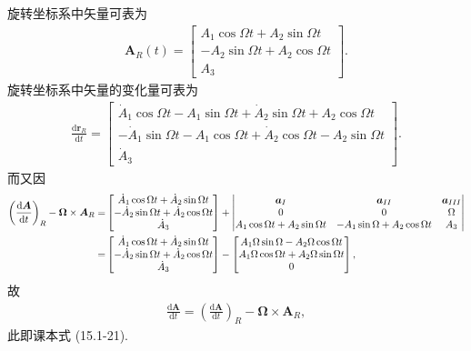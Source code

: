 \documentclass[twoside]{note}
\begin{document}
\begin{pf}
    旋转坐标系中矢量可表为
    \begin{align}
        \bm{A}_R(t)=\begin{bmatrix}
            A_1\cos\Omega t+A_2\sin\Omega t\\
            -A_2\sin\Omega t+A_2\cos\Omega t\\
            A_3
        \end{bmatrix}.
    \end{align}
    旋转坐标系中矢量的变化量可表为
    \begin{align}
        \frac{\mathrm{d}\bm{r}_R}{\mathrm{d}t}=\begin{bmatrix}
            \dot{A}_1\cos\Omega t-A_1\sin\Omega t+\dot{A}_2\sin\Omega t+A_2\cos\Omega t\\
            -\dot{A}_1\sin\Omega t-A_1\cos\Omega t+\dot{A}_2\cos\Omega t-A_2\sin\Omega t\\
            \dot{A}_3
        \end{bmatrix}.
    \end{align}
    而又因
    \begin{align}
        \notag\left(\frac{\mathrm{d}\bm{A}}{\mathrm{d}t}\right)_R-\bm{\Omega}\times\bm{A}_R=&\begin{bmatrix}
            \dot{A}_1\cos\Omega t+\dot{A}_2\sin\Omega t\\
            -\dot{A}_2\sin\Omega t+\dot{A}_2\cos\Omega t\\
            \dot{A}_3
        \end{bmatrix}+\begin{vmatrix}
            \bm{a}_I&\bm{a}_{II}&\bm{a}_{III}\\
            0&0&\Omega\\
            A_1\cos\Omega t+A_2\sin\Omega t&-A_1\sin\Omega+A_2\cos\Omega t&A_3
        \end{vmatrix}\\
        =&\begin{bmatrix}
            \dot{A}_1\cos\Omega t+\dot{A}_2\sin\Omega t\\
            -\dot{A}_2\sin\Omega t+\dot{A}_2\cos\Omega t\\
            \dot{A}_3
        \end{bmatrix}-\begin{bmatrix}
            A_1\Omega\sin\Omega-A_2\Omega\cos\Omega t\\
            A_1\Omega\cos\Omega t+A_2\Omega\sin\Omega t\\
            0
        \end{bmatrix},
    \end{align}
    故
    \begin{align}
        \frac{\mathrm{d}\bm{A}}{\mathrm{d}t}=\left(\frac{\mathrm{d}\bm{A}}{\mathrm{d}t}\right)_R-\bm{\Omega}\times\bm{A}_R,
    \end{align}
    此即课本式 (15.1-21).
\end{pf}
\ifx\allfiles\undefined
\end{document}
